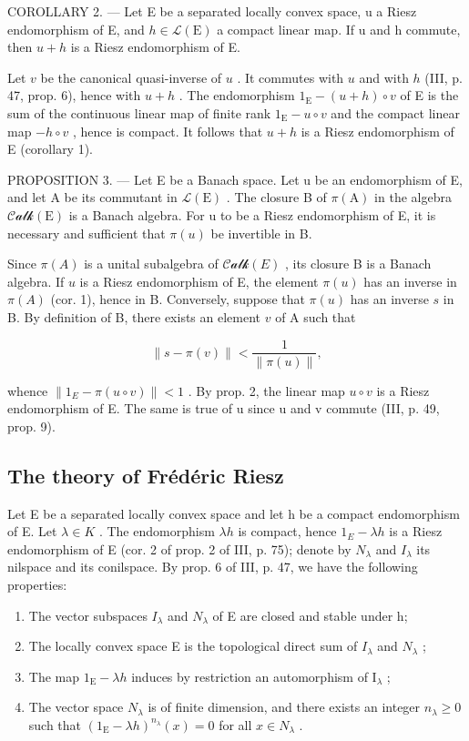 COROLLARY 2. --- Let E be a separated locally convex space, u a Riesz endomorphism of E, and \(h \in \mathcal{L}(\mathrm{E})\) a compact linear map. If u and h commute, then \(u + h\) is a Riesz endomorphism of E.

Let \(v\) be the canonical quasi-inverse of \(u\) . It commutes with \(u\) and with \(h\) (III, p. 47, prop. 6), hence with \(u + h\) . The endomorphism \(1_{\mathrm{E}} - (u + h) \circ v\) of E is the sum of the continuous linear map of finite rank \(1_{\mathrm{E}} - u \circ v\) and the compact linear map \(-h \circ v\) , hence is compact. It follows that \(u + h\) is a Riesz endomorphism of E (corollary 1).

PROPOSITION 3. --- Let E be a Banach space. Let u be an endomorphism of E, and let A be its commutant in \(\mathcal{L}(\mathrm{E})\) . The closure B of \(\pi(\mathrm{A})\) in the algebra \(\mathcal{Calk}(\mathrm{E})\) is a Banach algebra. For u to be a Riesz endomorphism of E, it is necessary and sufficient that \(\pi(u)\) be invertible in B.

Since \(\pi(A)\) is a unital subalgebra of \(\mathcal{Calk}(E)\) , its closure B is a Banach algebra. If \(u\) is a Riesz endomorphism of E, the element \(\pi(u)\) has an inverse in \(\pi(A)\) (cor. 1), hence in B. Conversely, suppose that \(\pi(u)\) has an inverse \(s\) in B. By definition of B, there exists an element \(v\) of A such that

\[
\left\| s - \pi (v) \right\| <   \frac {1}{\left\| \pi (u) \right\|},
\]

whence \(\|1_{E}-\pi(u\circ v)\|<1\) . By prop. 2, the linear map \(u\circ v\) is a Riesz endomorphism of E. The same is true of u since u and v commute (III, p. 49, prop. 9).

\subsection{The theory of Frédéric Riesz}

Let E be a separated locally convex space and let h be a compact endomorphism of E. Let \(\lambda \in K\) . The endomorphism \(\lambda h\) is compact, hence \(1_{E} - \lambda h\) is a Riesz endomorphism of E (cor. 2 of prop. 2 of III, p. 75); denote by \(N_{\lambda}\) and \(I_{\lambda}\) its nilspace and its conilspace. By prop. 6 of III, p. 47, we have the following properties:

\begin{enumerate}
\def\labelenumi{(\roman{enumi})}
\item
  The vector subspaces \(I_{\lambda}\) and \(N_{\lambda}\) of E are closed and stable under h;
\item
  The locally convex space E is the topological direct sum of \(I_{\lambda}\) and \(N_{\lambda}\) ;
\item
  The map \(1_{\mathrm{E}} - \lambda h\) induces by restriction an automorphism of \(\mathrm{I}_{\lambda}\) ;
\item
  The vector space \(N_{\lambda}\) is of finite dimension, and there exists an integer \(n_{\lambda} \geqslant 0\) such that \((1_{\mathrm{E}} - \lambda h)^{n_{\lambda}}(x) = 0\) for all \(x \in N_{\lambda}\) .
\end{enumerate}

